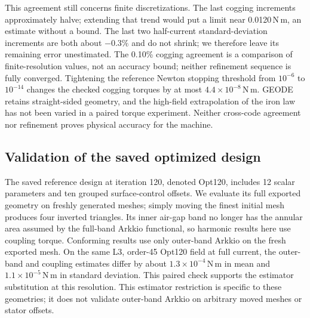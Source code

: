 \documentclass{anvil-paper}
\begin{document}
This agreement still concerns finite discretizations. The last cogging
increments approximately halve; extending that trend would put a limit
near 0.0120\,N\,m, an estimate without a bound. The last two half-current
standard-deviation increments are both about $-0.3\%$ and do not shrink;
we therefore leave its remaining error unestimated. The 0.10\% cogging
agreement is a comparison of finite-resolution values, not an accuracy
bound; neither refinement sequence is fully converged.
Tightening the reference Newton stopping threshold from $10^{-6}$ to
$10^{-14}$ changes the checked cogging torques by at most
$4.4\times10^{-8}$\,N\,m. GEODE retains straight-sided geometry, and the
high-field extrapolation of the iron law has not been varied in a paired
torque experiment. Neither cross-code agreement nor refinement proves
physical accuracy for the machine.

\subsection{Validation of the saved optimized design}\label{sec:opt120}
The saved reference design at iteration 120, denoted Opt120, includes
12 scalar parameters and ten grouped surface-control offsets. We evaluate
its full exported geometry on freshly generated meshes; simply moving
the finest initial mesh produces four inverted triangles. Its inner
air-gap band no longer has the annular area assumed by the full-band
Arkkio functional, so harmonic results here use coupling torque.
Conforming results use only outer-band Arkkio on the fresh exported mesh.
On the same L3, order-45 Opt120 field at full current, the outer-band and
coupling estimates differ by about $1.3\times10^{-4}$\,N\,m in mean and
$1.1\times10^{-5}$\,N\,m in standard deviation. This paired check supports
the estimator substitution at this resolution.
This estimator restriction is specific to these geometries; it does not
validate outer-band Arkkio on arbitrary moved meshes or stator offsets.
\end{document}
